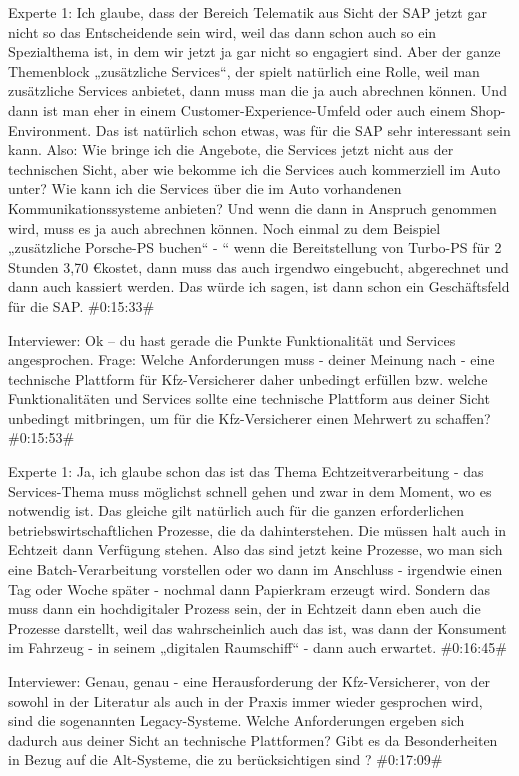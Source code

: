 Experte 1:
Ich glaube, dass der Bereich Telematik aus Sicht der SAP jetzt gar nicht so das Entscheidende sein wird, weil das dann schon auch so ein Spezialthema ist, in dem wir jetzt ja gar nicht so engagiert sind. Aber der ganze Themenblock „zusätzliche Services“, der spielt natürlich eine Rolle, weil man zusätzliche Services anbietet, dann muss man die ja auch abrechnen können. Und dann ist man eher in einem Customer-Experience-Umfeld oder auch einem Shop-Environment. Das ist natürlich schon etwas, was für die SAP sehr interessant sein kann. Also: Wie bringe ich die Angebote, die Services jetzt nicht aus der technischen Sicht, aber wie bekomme ich die Services auch kommerziell im Auto unter? Wie kann ich die Services über die im Auto vorhandenen Kommunikationssysteme anbieten? Und wenn die dann in Anspruch genommen wird, muss es ja auch abrechnen können. Noch einmal zu dem Beispiel „zusätzliche Porsche-PS buchen“ - “ wenn die Bereitstellung von Turbo-PS für 2 Stunden 3,70 \euro kostet, dann muss das auch irgendwo eingebucht, abgerechnet und dann auch kassiert werden. Das würde ich sagen, ist dann schon ein Geschäftsfeld für die SAP.
\#0:15:33\#

Interviewer:
Ok – du hast gerade die Punkte Funktionalität und Services angesprochen. Frage: Welche Anforderungen muss - deiner Meinung nach - eine technische Plattform für Kfz-Versicherer daher unbedingt erfüllen bzw. welche Funktionalitäten und Services sollte eine technische Plattform aus deiner Sicht unbedingt mitbringen, um für die Kfz-Versicherer einen Mehrwert zu schaffen? 
\#0:15:53\#

Experte 1:
Ja, ich glaube schon das ist das Thema Echtzeitverarbeitung - das Services-Thema muss möglichst schnell gehen und zwar in dem Moment, wo es notwendig ist. Das gleiche gilt natürlich auch für die ganzen erforderlichen betriebswirtschaftlichen Prozesse, die da dahinterstehen. Die müssen halt auch in Echtzeit dann Verfügung stehen. Also das sind jetzt keine Prozesse, wo man sich eine Batch-Verarbeitung vorstellen oder wo dann im Anschluss - irgendwie einen Tag oder Woche später - nochmal dann Papierkram erzeugt wird. Sondern das muss dann ein hochdigitaler Prozess sein, der in Echtzeit dann eben auch die Prozesse darstellt, weil das wahrscheinlich auch das ist, was dann der Konsument im Fahrzeug - in seinem „digitalen Raumschiff“ - dann auch erwartet. 
\#0:16:45\#

Interviewer:
Genau, genau - eine Herausforderung der Kfz-Versicherer, von der sowohl in der Literatur als auch in der Praxis immer wieder gesprochen wird, sind die sogenannten Legacy-Systeme. Welche Anforderungen ergeben sich dadurch aus deiner Sicht an technische Plattformen? Gibt es da Besonderheiten in Bezug auf die Alt-Systeme, die zu berücksichtigen sind ?
\#0:17:09\#

